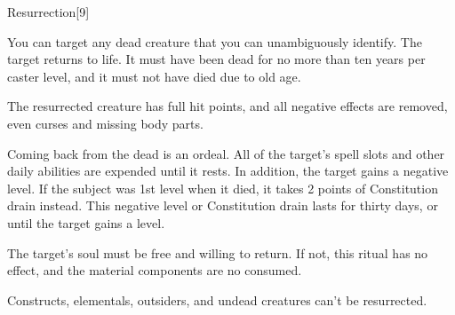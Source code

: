 \begin{spellsection}[Greater]{Resurrection}[9]
    \begin{spellheader}
    \end{spellheader}
    \begin{spellcontent}
        \begin{spelltargetinginfo}
        \end{spelltargetinginfo}
        \begin{spelleffects}

            \spellspecial You can target any dead creature that you can unambiguously identify.
            \spelleffect The target returns to life. It must have been dead for no more than ten years per caster level, and it must not have died due to old age.

            The resurrected creature has full hit points, and all negative effects are removed, even curses and missing body parts.

            \par Coming back from the dead is an ordeal. All of the target's spell slots and other daily abilities are expended until it rests. In addition, the target gains a negative level. If the subject was 1st level when it died, it takes 2 points of Constitution drain instead. This negative level or Constitution drain lasts for thirty days, or until the target gains a level.
        \end{spelleffects}
    \end{spellcontent}
    \begin{spellfooter}
        \spellnotes The target's soul must be free and willing to return. If not, this ritual has no effect, and the material components are no consumed.

        Constructs, elementals, outsiders, and undead creatures can't be resurrected.
    \end{spellfooter}
\end{spellsection}

